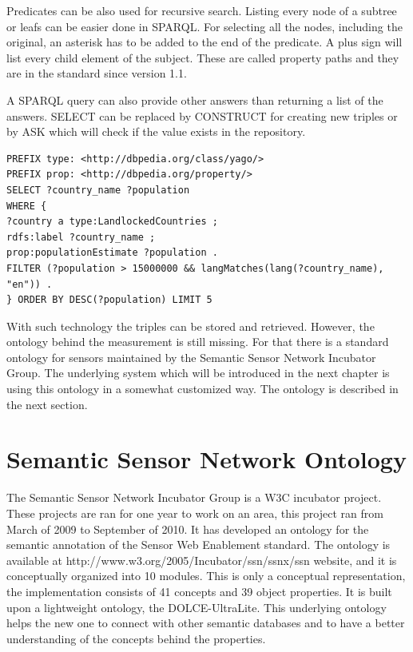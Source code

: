 Predicates can be also used for recursive search. Listing every node of a subtree or leafs can be easier done in SPARQL. For selecting all the nodes, including the original, an asterisk has to be added to the end of the predicate. A plus sign will list every child element of the subject. These are called property paths and they are in the standard since version 1.1.

A SPARQL query can also provide other answers than returning a list of the answers. SELECT can be replaced by CONSTRUCT for creating new triples or by ASK which will check if the value exists in the repository. 


\begin{lstlisting}[caption={Sample complex SPARQL which shows top 5 countries based on population using DBpedia\label{lst:sparqlcomplex}}]
PREFIX type: <http://dbpedia.org/class/yago/>
PREFIX prop: <http://dbpedia.org/property/>
SELECT ?country_name ?population
WHERE {
?country a type:LandlockedCountries ;
rdfs:label ?country_name ;
prop:populationEstimate ?population .
FILTER (?population > 15000000 && langMatches(lang(?country_name), "en")) .
} ORDER BY DESC(?population) LIMIT 5
\end{lstlisting}

With such technology the triples can be stored and retrieved. However, the ontology behind the measurement is still missing. For that there is a standard ontology for sensors maintained by the Semantic Sensor Network Incubator Group. The underlying system which will be introduced in the next chapter is using this ontology in a somewhat customized way\cite{g2d2}.  The ontology is described in the next section.

\section{Semantic Sensor Network Ontology}

The Semantic Sensor Network Incubator Group is a W3C incubator project. These projects are ran for one year to work on an area, this project ran from March of 2009 to September of 2010. It has developed an ontology for the semantic annotation of the Sensor Web Enablement standard. The ontology is available at http://www.w3.org/2005/Incubator/ssn/ssnx/ssn website, and it is conceptually organized into 10 modules. This is only a conceptual representation, the implementation consists of 41 concepts and 39 object properties. It is built upon a lightweight ontology, the  DOLCE-UltraLite. This underlying ontology helps the new one to connect with other semantic databases and to have a better understanding of the concepts behind the properties. 


